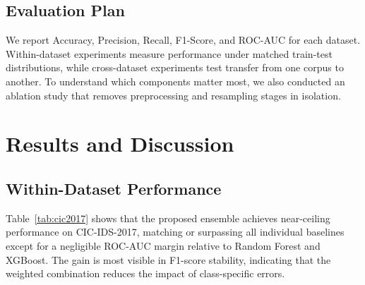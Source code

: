 \documentclass[conference]{IEEEtran}
\begin{document}
\subsection{Evaluation Plan}
We report Accuracy, Precision, Recall, F1-Score, and ROC-AUC for each dataset. Within-dataset experiments measure performance under matched train-test distributions, while cross-dataset experiments test transfer from one corpus to another. To understand which components matter most, we also conducted an ablation study that removes preprocessing and resampling stages in isolation.

\section{Results and Discussion}
\subsection{Within-Dataset Performance}
Table~\ref{tab:cic2017} shows that the proposed ensemble achieves near-ceiling performance on CIC-IDS-2017, matching or surpassing all individual baselines except for a negligible ROC-AUC margin relative to Random Forest and XGBoost. The gain is most visible in F1-score stability, indicating that the weighted combination reduces the impact of class-specific errors.

\begin{table}[htbp]
\caption{Binary Classification Results on CIC-IDS-2017.}
\label{tab:cic2017}
\centering
{}
\end{table}
\end{document}
